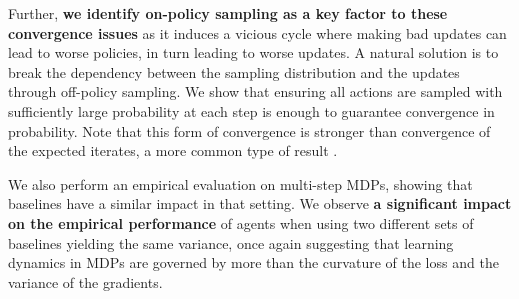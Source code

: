 Further, \textbf{we identify on-policy sampling as a key factor to these convergence issues} as it induces a vicious cycle where making bad updates can lead to worse policies, in turn leading to worse updates. A natural solution is to break the dependency between the sampling distribution and the updates through off-policy sampling. We show that ensuring all actions are sampled with sufficiently large probability at each step is enough to guarantee convergence in probability. Note that this form of convergence is stronger than convergence of the expected iterates, a more common type of result \citep[e.g.,][]{mei2020global,agarwal2019optimality}.

We also perform an empirical evaluation on multi-step MDPs, showing that baselines have a similar impact in that setting. We observe \textbf{a significant impact on the empirical performance} of agents when using two different sets of baselines yielding the same variance, once again suggesting that learning dynamics in MDPs are governed by more than the curvature of the loss and the variance of the gradients.



